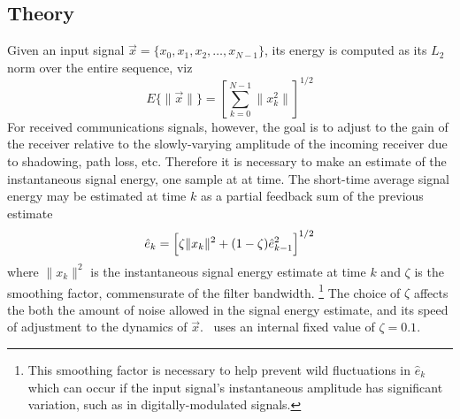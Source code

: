 \subsection{Theory}
\label{module:agc:theory}
Given an input signal
$\vec{x} = \{ x_0, x_1, x_2, \ldots, x_{N-1} \}$,
its energy is computed as its $L_2$ norm over the entire sequence, viz
\begin{equation}
\label{eqn:agc:energy}
    E\{ \|\vec{x}\| \} = 
        \left[
            \sum\limits_{k=0}^{N-1} {\|x_k^2\|}
        \right]^{1/2}
\end{equation}
For received communications signals, however, the goal is to adjust to the
gain of the receiver relative to the slowly-varying amplitude of the incoming
receiver due to shadowing, path loss, etc.
Therefore it is necessary to make an estimate of the instantaneous signal
energy, one sample at at time.
The short-time average signal energy may be estimated at time $k$ as a partial
feedback sum of the previous estimate
\begin{equation}
\label{eq:module:agc:ehat}
    \hat{e}_k =
        \Bigl[
            \zeta\|x_k\|^2 + (1-\zeta)\hat{e}_{k-1}^2
        \Bigr]^{1/2}
\end{equation}
where $\| x_k \|^2$ is the instantaneous signal energy estimate at time
$k$ and $\zeta$ is the smoothing factor, commensurate of the filter bandwidth.%
\footnote{
    This smoothing factor is necessary to help prevent wild fluctuations
    in $\hat{e}_k$ which can occur if the input signal's instantaneous
    amplitude has significant variation, such as in digitally-modulated
    signals.}
The choice of $\zeta$ affects the both the amount of noise allowed in the
signal energy estimate, and its speed of adjustment to the dynamics of
$\vec{x}$.
\liquid\ uses an internal fixed value of $\zeta=0.1$.

